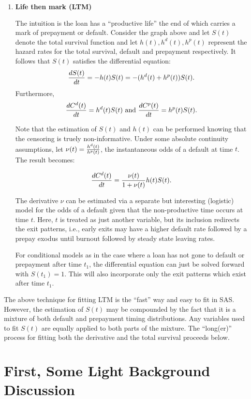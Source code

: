 \documentclass[10pt]{article}
\begin{document}
\begin{enumerate}
\item {\bf Life then mark (LTM)}

	The intuition is the loan has a ``productive life'' the end of which carries a mark of prepayment or default.  Consider the graph above and 
	let $S(t)$ denote the total survival function and let $h(t), h^d(t), h^p(t)$ represent the hazard rates for the total survival, default and
	prepayment respectively.  It follows that $S(t)$ satisfies the differential equation:
	$$ {dS(t) \over dt}=-h(t)S(t)=-(h^d(t)+h^p(t))S(t).$$
	Furthermore,
	$$ {dC^d(t) \over dt}=h^d(t)S(t) \text{~and~} {dC^p(t) \over dt}=h^p(t)S(t).$$

	Note that the estimation of $S(t)$ and $h(t)$ can be performed knowing that the censoring is truely non-informative.  Under some absolute 
	continuity assumptions, let $\nu(t)={h^d(t) \over h^p(t)}$, the instantaneous odds of a default at time $t$.  The result becomes:

	$$ {dC^d(t) \over dt}={\nu(t)\over 1+\nu(t)}h(t)S(t).$$

	The derivative $\nu$ can be estimated via a separate but interesting (logistic) model for the odds of a default given that the non-productive time
	occurs at time $t$.  Here, $t$ is treated as just another variable, but its inclusion redirects the exit patterns, i.e., early exits may have a higher 
	default rate 
	followed by a prepay exodus until burnout followed by steady state leaving rates. 

	For conditional models as in the case where a loan has not gone to default or prepayment after time $t_1$, the differential equation can just be 
	solved forward with $S(t_1)=1$.  This will also incorporate only the exit patterns which exist after time $t_1$.

\end{enumerate}


The above technique for fitting LTM is the ``fast'' way and easy to fit in SAS.  However, the estimation of $S(t)$ may be compounded 
by the fact that it is a mixture of both default and prepayment timing distributions.  Any variables used to fit $S(t)$ are equally applied to both 
parts of the mixture.  The ``long(er)'' process for fitting both the derivative and the total survival proceeds below.
 
\section{First, Some Light Background Discussion}
 
\end{document}
